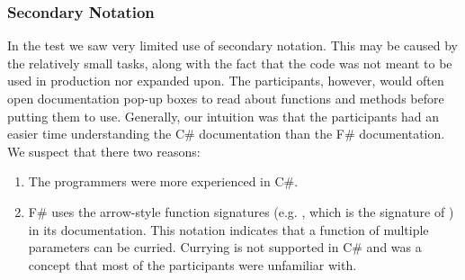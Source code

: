 \subsubsection{Secondary Notation}
In the test we saw very limited use of secondary notation. This may be caused by the relatively small tasks, along with the fact that the code was not meant to be used in production nor expanded upon. The participants, however, would often open documentation pop-up boxes to read about functions and methods before putting them to use. Generally, our intuition was that the participants had an easier time understanding the C\# documentation than the F\# documentation. We suspect that there two reasons:
\begin{enumerate}
    \item The programmers were more experienced in C\#.
    \item F\# uses the arrow-style function signatures (e.g. , which is the signature of ) in its documentation. This notation indicates that a function of multiple parameters can be curried. Currying is not supported in C\# and was a concept that most of the participants were unfamiliar with.
\end{enumerate}